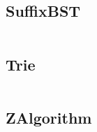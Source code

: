 \documentclass[a4]{article}
\begin{document}
\subsection{SuffixBST}
\inputminted[mathescape,linenos,numbersep=5pt,frame=lines,framesep=2mm]{cpp}{src/string/SuffixBST.cpp}
\subsection{Trie}
\inputminted[mathescape,linenos,numbersep=5pt,frame=lines,framesep=2mm]{cpp}{src/string/Trie.cpp}
\subsection{ZAlgorithm}
\inputminted[mathescape,linenos,numbersep=5pt,frame=lines,framesep=2mm]{cpp}{src/string/ZAlgorithm.cpp}

\end{document}
